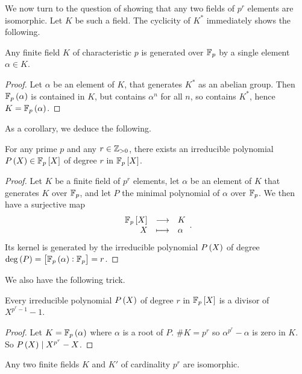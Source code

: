 We now turn to the question of showing that any two fields of $ p^r $ elements are isomorphic. Let $ K $ be such a field. The cyclicity of $ K^* $ immediately shows the following.

\begin{proposition}
Any finite field $ K $ of characteristic $ p $ is generated over $ \mathbb{F}_p $ by a single element $ \alpha \in K $.
\end{proposition}

\begin{proof}
Let $ \alpha $ be an element of $ K $, that generates $ K^* $ as an abelian group. Then $ \F_p\br{\alpha} $ is contained in $ K $, but contains $ \alpha^n $ for all $ n $, so contains $ K^* $, hence $ K = \F_p\br{\alpha} $.
\end{proof}

As a corollary, we deduce the following.

\begin{proposition}
For any prime $ p $ and any $ r \in \mathbb{Z}_{> 0} $, there exists an irreducible polynomial $ P\br{X} \in \F_p\sbr{X} $ of degree $ r $ in $ \F_p\sbr{X} $.
\end{proposition}

\begin{proof}
Let $ K $ be a finite field of $ p^r $ elements, let $ \alpha $ be an element of $ K $ that generates $ K $ over $ \mathbb{F}_p $, and let $ P $ the minimal polynomial of $ \alpha $ over $ \mathbb{F}_p $. We then have a surjective map
$$ \function{\F_p\sbr{X}}{K}{X}{\alpha}. $$
Its kernel is generated by the irreducible polynomial $ P\br{X} $ of degree $ \deg\br{P} = \sbr{\F_p\br{\alpha} : \F_p} = r $.
\end{proof}

We also have the following trick.

\begin{lemma}
Every irreducible polynomial $ P\br{X} $ of degree $ r $ in $ \F_p\sbr{X} $ is a divisor of $ X^{p^r - 1} - 1 $.
\end{lemma}

\begin{proof}
Let $ K = \F_p\br{\alpha} $ where $ \alpha $ is a root of $ P $. $ \#K = p^r $ so $ \alpha^{p^r} - \alpha $ is zero in $ K $. So $ P\br{X} \mid X^{p^r} - X $.
\end{proof}

\begin{corollary}
Any two finite fields $ K $ and $ K' $ of cardinality $ p^r $ are isomorphic.
\end{corollary}

